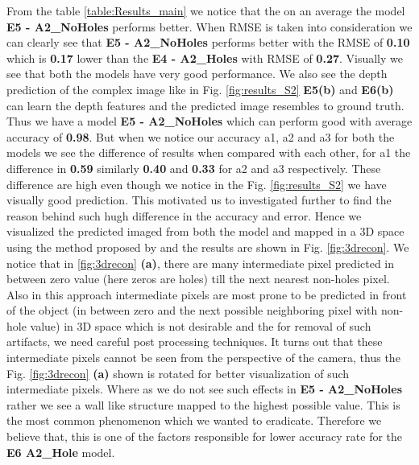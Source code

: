 From the table \ref{table:Results_main} we notice that the on an average the model \textbf{E5 - A2\_NoHoles} performs better. When RMSE is taken into consideration we can clearly see that \textbf{E5 - A2\_NoHoles} performs better with the RMSE of \textbf{0.10} which is \textbf{0.17} lower than the \textbf{E4 - A2\_Holes} with RMSE of \textbf{0.27}. Visually we see that both the models have very good performance. We also see the depth prediction of the complex image like in Fig. \ref{fig:results_S2} \textbf{E5(b)} and  \textbf{E6(b)} can learn the depth features and the predicted image resembles to ground truth. Thus we have a model \textbf{E5 - A2\_NoHoles} which can perform good with average accuracy of \textbf{0.98}. But when we notice our accuracy a1, a2 and a3 for both the models we see the difference of results when compared with each other, for a1 the difference in \textbf{0.59} similarly \textbf{0.40} and \textbf{0.33} for a2 and a3 respectively. These difference are high even though we notice in the Fig. \ref{fig:results_S2} we have visually good prediction. This motivated us to investigated further to find the reason behind such hugh difference in the accuracy and error. Hence we visualized the predicted imaged from both the model and mapped in a 3D space using the method proposed by \cite{Zhou2018} and the results are shown in Fig. \ref{fig:3drecon}. We notice that in \ref{fig:3drecon} \textbf{(a)}, there are many intermediate pixel predicted in between zero value (here zeros are holes) till the next nearest non-holes pixel. Also in this approach intermediate pixels are most prone to be predicted in front of the object (in between zero and the next possible neighboring pixel with non-hole value) in 3D space which is not desirable and the for removal of such artifacts, we need careful post processing techniques. It turns out that these intermediate pixels cannot be seen from the perspective of the camera, thus the Fig. \ref{fig:3drecon} \textbf{(a)} shown is rotated for better visualization of such intermediate pixels. Where as we do not see such effects in \textbf{E5 - A2\_NoHoles} rather we see a wall like structure mapped to the highest possible value. This is the most common phenomenon which we wanted to eradicate. Therefore we believe that, this is one of the factors responsible for lower accuracy rate for the \textbf{E6 A2\_Hole} model. 

